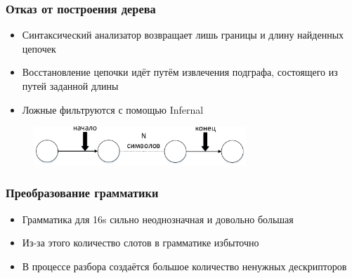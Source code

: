 \documentclass{beamer}
\begin{document}
\begin{frame}
    \frametitle{Отказ от построения дерева}
    \begin{itemize}
        \item Синтаксический анализатор возвращает лишь границы и длину найденных цепочек
        \item Восстановление цепочки идёт путём извлечения подграфа, состоящего из путей заданной длины
        \item Ложные фильтруются с помощью Infernal
    \end{itemize}
    
    \begin{figure}[b]
        \centering
        \includegraphics[width=8cm]{pictures/noTree.pdf}  
    \end{figure}
\end{frame}

\begin{frame}
    \frametitle{Преобразование грамматики}
    \begin{itemize}
        \item Грамматика для 16s сильно неоднозначная и довольно большая 
        \item Из-за этого количество слотов в грамматике избыточно
        \item В процессе разбора создаётся большое количество ненужных дескрипторов 
    \end{itemize} 
\end{frame}
\end{document}
